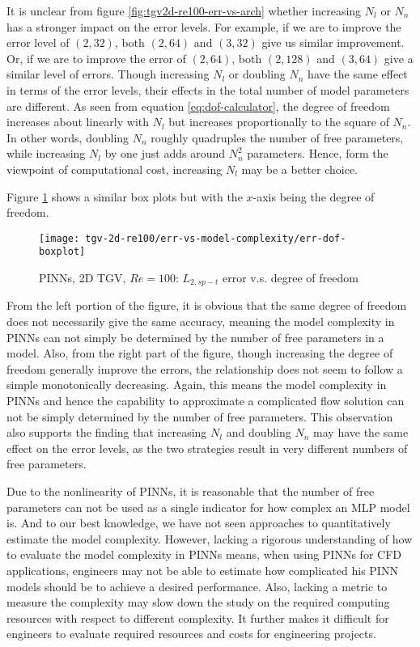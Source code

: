It is unclear from figure \ref{fig:tgv2d-re100-err-vs-arch} whether increasing $N_l$ or $N_n$ has a stronger impact on the error levels.
For example, if we are to improve the error level of $(2, 32)$, both $(2, 64)$ and $(3, 32)$ give us similar improvement.
Or, if we are to improve the error of $(2, 64)$, both $(2, 128)$ and $(3, 64)$ give a similar level of errors.
Though increasing $N_l$ or doubling $N_n$ have the same effect in terms of the error levels, their effects in the total number of model parameters are different. 
As seen from equation \eqref{eq:dof-calculator}, the degree of freedom increases about linearly with $N_l$ but increases proportionally to the square of $N_n$.
In other words, doubling $N_n$ roughly quadruples the number of free parameters, while increasing $N_l$ by one just adds around $N_n^2$ parameters.
Hence, form the viewpoint of computational cost, increasing $N_l$ may be a better choice.

Figure \ref{fig:tgv2d-re100-err-vs-dof} shows a similar box plots but with the $x$-axis being the degree of freedom.
\begin{figure}[hbt!]
    \centering%
    \texttt{[image: tgv-2d-re100/err-vs-model-complexity/err-dof-boxplot]}
    \caption[%
        PINNs, 2D TGV, $Re=100$: $L_{2,sp-t}$ error v.s. degree of freedom%
    ]{%
        PINNs, 2D TGV, $Re=100$: $L_{2,sp-t}$ error v.s. degree of freedom%
    }
    \label{fig:tgv2d-re100-err-vs-dof}
\end{figure}
From the left portion of the figure, it is obvious that the same degree of freedom does not necessarily give the same accuracy, meaning the model complexity in PINNs can not simply be determined by the number of free parameters in a model.
Also, from the right part of the figure, though increasing the degree of freedom generally improve the errors, the relationship does not seem to follow a simple monotonically decreasing.
Again, this means the model complexity in PINNs and hence the capability to approximate a complicated flow solution can not be simply determined by the number of free parameters.
This observation also supports the finding that increasing $N_l$ and doubling $N_n$ may have the same effect on the error levels, as the two strategies result in very different numbers of free parameters.

Due to the nonlinearity of PINNs, it is reasonable that the number of free parameters can not be used as a single indicator for how complex an MLP model is.
And to our best knowledge, we have not seen approaches to quantitatively estimate the model complexity.
However, lacking a rigorous understanding of how to evaluate the model complexity in PINNs means, when using PINNs for CFD applications, engineers may not be able to estimate how complicated his PINN models should be to achieve a desired performance.
Also, lacking a metric to measure the complexity may slow down the study on the required computing resources with respect to different complexity.
It further makes it difficult for engineers to evaluate required resources and costs for engineering projects.

